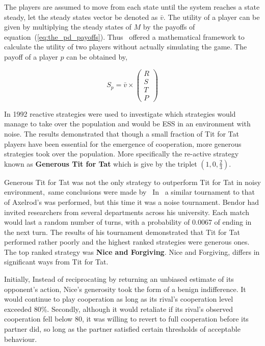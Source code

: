 \documentclass{article}
\theoremstyle{definition}
\begin{document}
The players are assumed to move from each state until the system reaches a state
steady, let the steady states vector be denoted as \(\bar{v}\).
The utility of a player can be given by multiplying the steady states of
\(M\) by the payoffs of equation~(\ref{eq:the_pd_payoffs}). Thus~\cite{Nowak1990}
offered a mathematical framework to calculate the utility of two players without
actually simulating the game. The payoff of a player \(p\) can be obtained by,

\[S_p = \bar{v} \times \begin{pmatrix} R \\ S \\ T \\ P \end{pmatrix}\]

In 1992 reactive strategies were used
to investigate which strategies would manage to take over
the population and would be ESS in an environment with noise. The results demonstrated that 
though a small fraction of Tit for Tat players have been essential for the emergence
of cooperation, more generous strategies took over the population. More specifically
the re-active strategy known as \textbf{Generous Tit for Tat} which is give by
the triplet \((1, 0, \frac{2}{3})\).

Generous Tit for Tat was not the only strategy to outperform Tit for Tat in
noisy environment,~same conclusions were made by~\cite{Godfray1992, Bendor1991}
In~\cite{Bendor1991} a similar tournament to that of Axelrod's was performed,
but this time it was a noise tournament. Bendor had invited researchers from several
departments across his university. Each match would last a random number of turns,
with a probability of 0.0067 of ending in the next turn. The results of his
tournament demonstrated that Tit for Tat performed rather poorly and the highest
ranked strategies were generous ones. The top ranked strategy was
\textbf{Nice and Forgiving}. Nice and Forgiving, differs in significant ways
from Tit for Tat.

Initially, Instead of reciprocating by returning an unbiased estimate of its opponent's
action, Nice's generosity took the form of a benign indifference. It would continue
to play cooperation as long as its rival's cooperation level exceeded 80\%.
Secondly, although it would retaliate if its rival's observed cooperation fell
below 80, it was willing to revert to full cooperation before its partner did,
so long as the partner satisfied certain thresholds of acceptable behaviour.
\end{document}
